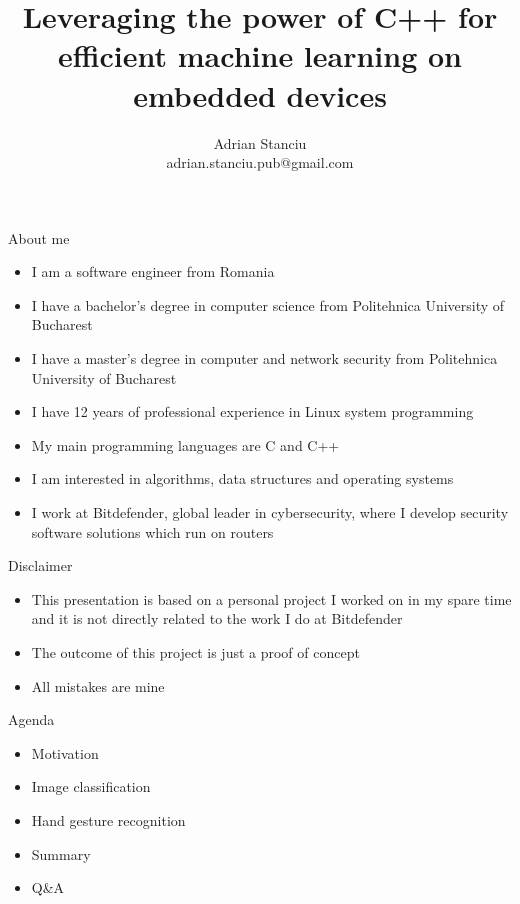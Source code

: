 \documentclass{beamer}
\title{Leveraging the power of C++ for efficient machine learning on embedded
devices}
\subtitle{}
\author{Adrian Stanciu\\{\small adrian.stanciu.pub@gmail.com}}
\date{}
\institute{NDC TechTown, 2023}
\begin{document}
\frame{\titlepage}

\begin{frame}{About me}
  \begin{itemize}
	\item I am a software engineer from Romania
	\item I have a bachelor's degree in computer science from Politehnica
	University of Bucharest
	\item I have a master's degree in computer and network security from
	Politehnica University of Bucharest
	\item I have 12 years of professional experience in Linux system
	programming
	\item My main programming languages are C and C++
	\item I am interested in algorithms, data structures and operating systems
	\item I work at Bitdefender, global leader in cybersecurity, where I
	develop security software solutions which run on routers
  \end{itemize}
\end{frame}

\begin{frame}{Disclaimer}
  \begin{itemize}
	\item This presentation is based on a personal project I worked on in my
	spare time and it is not directly related to the work I do at Bitdefender
	\item The outcome of this project is just a proof of concept
	\item All mistakes are mine
  \end{itemize}
\end{frame}

\begin{frame}{Agenda}
  \begin{itemize}
	\item Motivation
	\item Image classification
	\item Hand gesture recognition
	\item Summary
	\item Q\&A
  \end{itemize}
\end{frame}





\end{document}

